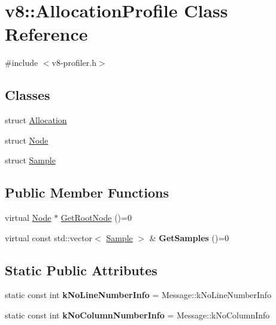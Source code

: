 \hypertarget{classv8_1_1AllocationProfile}{}\section{v8\+:\+:Allocation\+Profile Class Reference}
\label{classv8_1_1AllocationProfile}


{\ttfamily \#include $<$v8-\/profiler.\+h$>$}

\subsection*{Classes}
\begin{DoxyCompactItemize}
\item 
struct \mbox{\hyperlink{structv8_1_1AllocationProfile_1_1Allocation}{Allocation}}
\item 
struct \mbox{\hyperlink{structv8_1_1AllocationProfile_1_1Node}{Node}}
\item 
struct \mbox{\hyperlink{structv8_1_1AllocationProfile_1_1Sample}{Sample}}
\end{DoxyCompactItemize}
\subsection*{Public Member Functions}
\begin{DoxyCompactItemize}
\item 
virtual \mbox{\hyperlink{structv8_1_1AllocationProfile_1_1Node}{Node}} $\ast$ \mbox{\hyperlink{classv8_1_1AllocationProfile_afea045dae30df5477088e2f0b7edb6c4}{Get\+Root\+Node}} ()=0
\item 
\mbox{\label{classv8_1_1AllocationProfile_a5dae5644e119c5c9ef699e27b98ab92d}} 
virtual const std\+::vector$<$ \mbox{\hyperlink{structv8_1_1AllocationProfile_1_1Sample}{Sample}} $>$ \& {\bfseries Get\+Samples} ()=0
\end{DoxyCompactItemize}
\subsection*{Static Public Attributes}
\begin{DoxyCompactItemize}
\item 
\mbox{\label{classv8_1_1AllocationProfile_a26fdfe9e4846d26c83d0ad8c2ed2d783}} 
static const int {\bfseries k\+No\+Line\+Number\+Info} = Message\+::k\+No\+Line\+Number\+Info
\item 
\mbox{\label{classv8_1_1AllocationProfile_a9cfa103f73e82629694eee3734826eb7}} 
static const int {\bfseries k\+No\+Column\+Number\+Info} = Message\+::k\+No\+Column\+Info
\end{DoxyCompactItemize}


